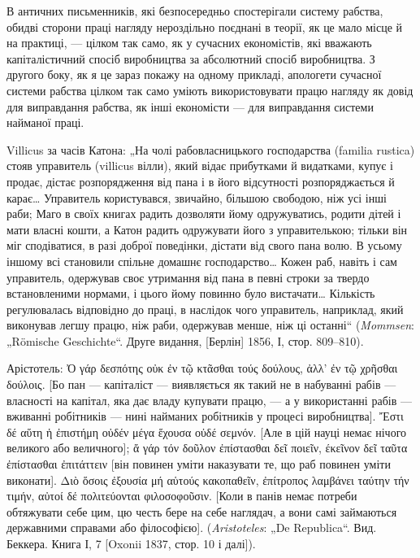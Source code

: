 В античних письменників, які безпосередньо спостерігали
систему рабства, обидві сторони праці нагляду нероздільно поєднані
в теорії, як це мало місце й на практиці, — цілком так
само, як у сучасних економістів, які вважають капіталістичний
спосіб виробництва за абсолютний спосіб виробництва. З другого
боку, як я це зараз покажу на одному прикладі, апологети
сучасної системи рабства цілком так само уміють використовувати
працю нагляду як довід для виправдання рабства, як інші
економісти — для виправдання системи найманої праці.

Villicus за часів Катона: „На чолі рабовласницького господарства
(familia rustica) стояв управитель (villicus вілли), який відає
прибутками й видатками, купує і продає, дістає розпорядження
від пана і в його відсутності розпоряджається й карає\dots{}
Управитель користувався, звичайно, більшою свободою, ніж
усі інші раби; Маго в своїх книгах радить дозволяти йому одружуватись,
родити дітей і мати власні кошти, а Катон радить
одружувати його з управителькою; тільки він міг сподіватися,
в разі доброї поведінки, дістати від свого пана волю. В усьому
іншому всі становили спільне домашнє господарство\dots{} Кожен
раб, навіть і сам управитель, одержував своє утримання від
пана в певні строки за твердо встановленими нормами, і цього
йому повинно було вистачати\dots{} Кількість регулювалась відповідно
до праці, в наслідок чого управитель, наприклад, який
виконував легшу працю, ніж раби, одержував менше, ніж ці
останні“ (\emph{Mommsen}: „Römische Geschichte“. Друге видання, [Берлін]
1856, І, стор. 809--810).

Арістотель: \textgreek{Ὀ γάρ δεσπότης οὐκ ἐν τῷ  κτᾶσθαι τούς δούλους, ἀλλ’ ἐν τῷ
χρῆσθαι δούλοις}. [Бо пан — капіталіст — виявляється як такий не в
набуванні рабів — власності на капітал, яка дає владу купувати
працю, — а у використанні рабів — вживанні робітників — нині
найманих робітників у процесі виробництва]. \textgreek{Ἔστι δέ αὕτη ἡ ἐπιστήμη
οὐδέν μέγα ἕχουσα οὐδέ σεμνόν}. [Але в цій науці немає нічого великого
або величного]; \textgreek{ἄ γάρ τόν δοῦλον ἐπίστασθαι δεῖ ποιεῖν, έκεῖνον δεῖ
ταῦτα ἐπίστασθαι ἐπιτάττειν} [він повинен уміти наказувати те, що раб
повинен уміти виконати]. \textgreek{Διὸ ὅσοις ἐξουσία μή αὑτούς κακοπαθεῖν, ἐπίτροπος
λαμβάνει ταύτην τήν τιμήν, αὐτοί δέ πολιτεύονται φιλοσοφοῦσιν}.
[Коли в панів немає потреби обтяжувати себе цим, цю честь
бере на себе наглядач, а вони самі займаються державними
справами або філософією]. (\emph{Aristoteles}: „De Republica“. Вид.
Беккера. Книга І, 7 [Oxonii 1837, стор. 10 і далі]).


